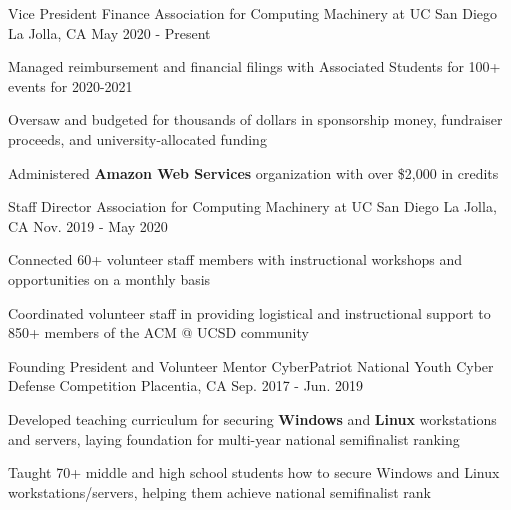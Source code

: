 
\begin{cventries}

  \cventry
    {Vice President Finance} %
    {Association for Computing Machinery at UC San Diego} %
    {La Jolla, CA} %
    {May 2020 - Present} %
    {
      \begin{cvitems} %
        \item {Managed reimbursement and financial filings with Associated Students for 100+ events for 2020-2021}
        \item {Oversaw and budgeted for thousands of dollars in sponsorship money, fundraiser proceeds, and university-allocated funding}
        \item {Administered \textbf{Amazon Web Services} organization with over \$2,000 in credits}
      \end{cvitems}
    }

\cventry
{Staff Director} %
{Association for Computing Machinery at UC San Diego} %
{La Jolla, CA} %
{Nov. 2019 - May 2020} %
{
  \begin{cvitems} %
    \item {Connected 60+ volunteer staff members with instructional workshops and opportunities on a monthly basis}
    \item {Coordinated volunteer staff in providing logistical and instructional support to 850+ members of the ACM @ UCSD community}
  \end{cvitems}
}

  \cventry
    {Founding President and Volunteer Mentor} %
    {CyberPatriot National Youth Cyber Defense Competition} %
    {Placentia, CA} %
    {Sep. 2017 - Jun. 2019} %
    {
      \begin{cvitems} %
        \item {Developed teaching curriculum for securing \textbf{Windows} and \textbf{Linux} workstations and servers, laying foundation for multi-year national semifinalist ranking}
        \item {Taught 70+ middle and high school students how to secure Windows and Linux workstations/servers, helping them achieve national semifinalist rank}
      \end{cvitems}
    }

\end{cventries}
